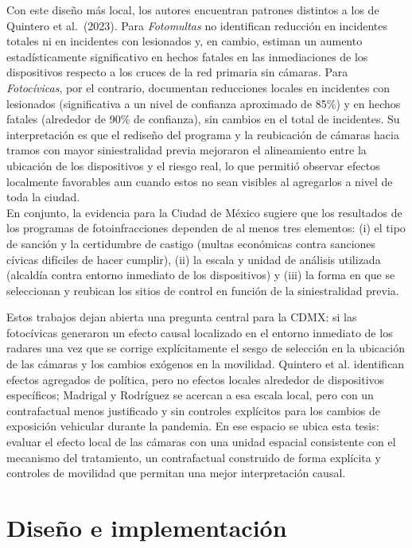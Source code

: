 Con este diseño más local, los autores encuentran patrones distintos a los de Quintero et al.\ (2023). Para \emph{Fotomultas} no identifican reducción en incidentes totales ni en incidentes con lesionados y, en cambio, estiman un aumento estadísticamente significativo en hechos fatales en las inmediaciones de los dispositivos respecto a los cruces de la red primaria sin cámaras. Para \emph{Fotoc\'ivicas}, por el contrario, documentan reducciones locales en incidentes con lesionados (significativa a un nivel de confianza aproximado de 85\%) y en hechos fatales (alrededor de 90\% de confianza), sin cambios en el total de incidentes. Su interpretación es que el rediseño del programa y la reubicación de cámaras hacia tramos con mayor siniestralidad previa mejoraron el alineamiento entre la ubicación de los dispositivos y el riesgo real, lo que permitió observar efectos localmente favorables aun cuando estos no sean visibles al agregarlos a nivel de toda la ciudad.\\

En conjunto, la evidencia para la Ciudad de México sugiere que los resultados de los programas de fotoinfracciones dependen de al menos tres elementos: (i) el tipo de sanción y la certidumbre de castigo (multas económicas contra sanciones cívicas difíciles de hacer cumplir), (ii) la escala y unidad de análisis utilizada (alcaldía contra entorno inmediato de los dispositivos) y (iii) la forma en que se seleccionan y reubican los sitios de control en función de la siniestralidad previa.

Estos trabajos dejan abierta una pregunta central para la CDMX: si las fotocívicas generaron un efecto causal localizado en el entorno inmediato de los radares una vez que se corrige explícitamente el sesgo de selección en la ubicación de las cámaras y los cambios exógenos en la movilidad. Quintero et al. identifican efectos agregados de política, pero no efectos locales alrededor de dispositivos específicos; Madrigal y Rodríguez se acercan a esa escala local, pero con un contrafactual menos justificado y sin controles explícitos para los cambios de exposición vehicular durante la pandemia. En ese espacio se ubica esta tesis: evaluar el efecto local de las cámaras con una unidad espacial consistente con el mecanismo del tratamiento, un contrafactual construido de forma explícita y controles de movilidad que permitan una mejor interpretación causal.

\section{Diseño e implementación}

